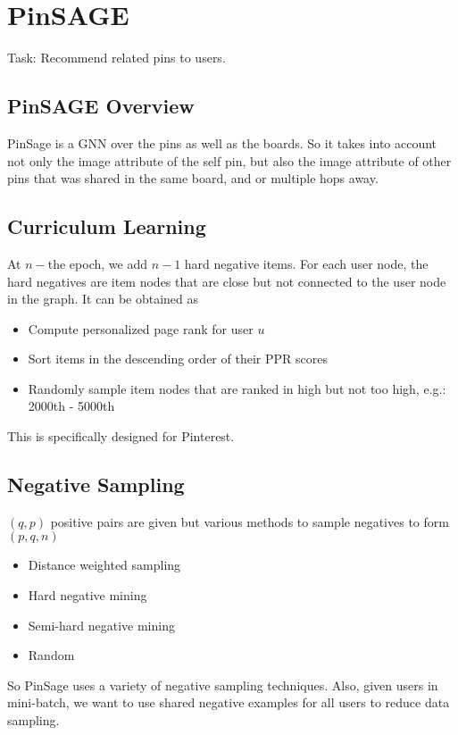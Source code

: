 \section{PinSAGE} 
Task: Recommend related pins to users. 

\subsection{PinSAGE Overview} 
PinSage is a GNN over the pins as well as the boards. So it takes into account not only the image attribute of the self pin, but also the image attribute of other pins that was shared in the same board, and or multiple hops away. 

\subsection{Curriculum Learning} 
At $n-$the epoch, we add $n-1$ hard negative items. For each user node, the hard negatives are item nodes that are close but not connected to the user node in the graph. It can be obtained as 
    \begin{itemize}
        \item Compute personalized page rank for user $u$
        \item Sort items in the descending order of their PPR scores
        \item Randomly sample item nodes that are ranked in high but not too high, e.g.: 2000th - 5000th
    \end{itemize}
This is specifically designed for Pinterest. 


\subsection{Negative Sampling}
$(q,p)$ positive pairs are given but various methods to sample negatives to form $(p,q,n)$
    \begin{itemize}
        \item Distance weighted sampling 
        \item Hard negative mining 
        \item Semi-hard negative mining 
        \item Random 
    \end{itemize}
So PinSage uses a variety of negative sampling techniques.  Also, given users in mini-batch, we want to use shared negative examples for all users to reduce data sampling. 